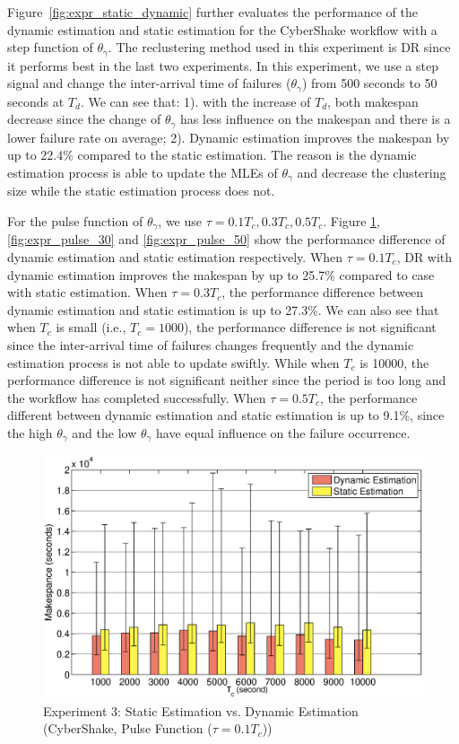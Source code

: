 Figure~\ref{fig:expr_static_dynamic} further evaluates the performance of the dynamic estimation and static estimation for the CyberShake workflow with a step function of $\theta_{\gamma}$. The reclustering method used in this experiment is DR since it performs best in the last two experiments. In this experiment, we use a step signal and change the inter-arrival time of failures ($\theta_{\gamma}$) from 500 seconds to 50 seconds at $T_d$. We can see that: 1). with the increase of $T_d$, both makespan decrease since the change of  $\theta_{\gamma}$ has less influence on the makespan and there is a lower failure rate on average; 2). Dynamic estimation improves the makespan by up to 22.4\% compared to the static estimation. The reason is the dynamic estimation process is able to update the MLEs of $\theta_{\gamma}$ and decrease the clustering size while the static estimation process does not. 

For the pulse function of $\theta_{\gamma}$, we use $\tau=0.1T_c, 0.3T_c, 0.5T_c$. Figure \ref{fig:expr_pulse_10}, \ref{fig:expr_pulse_30} and \ref{fig:expr_pulse_50} show the performance difference of dynamic estimation and static estimation respectively. When $\tau=0.1T_c$, DR with dynamic estimation improves the makespan by up to 25.7\% compared to case with static estimation. When $\tau=0.3T_c$, the performance difference between dynamic estimation and static estimation is up to 27.3\%. We can also see that when $T_c$ is small (i.e., $T_c=1000$), the performance difference is not significant since the inter-arrival time of failures changes frequently and the dynamic estimation process is not able to update swiftly. While when $T_c$ is 10000, the performance difference is not significant neither since the period is too long and the workflow has completed successfully. When $\tau=0.5T_c$, the performance different between dynamic estimation and static estimation is up to 9.1\%, since the high $\theta_{\gamma}$ and the low $\theta_{\gamma}$ have equal influence on the failure occurrence. 


\begin{figure}[!htb]
\centering
  \includegraphics[width=1\linewidth]{figures/tolerance/pulse_t10.eps}
  \caption{Experiment 3: Static Estimation vs. Dynamic Estimation (CyberShake, Pulse Function ($\tau=0.1T_c$))}
  \label{fig:expr_pulse_10}
\end{figure}

